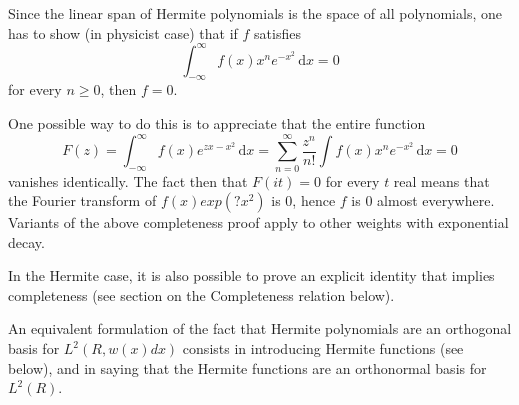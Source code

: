 Since the linear span of Hermite polynomials is the space of all polynomials, 
one has to show (in physicist case) that if $f$ satisfies
\begin{equation}
\int_{-\infty}^\infty f(x) x^n e^{- x^2} \, \mathrm{d}x = 0
\end{equation}
for every $n \geq 0$, then $f =0$.

One possible way to do this is to appreciate that the entire function
\begin{equation}
F(z) = \int_{-\infty}^\infty f(x) e^{z x - x^2} \, \mathrm{d}x = \sum_{n=0}^\infty \frac{z^n}{n!}\int f(x) x^n e^{- x^2} \, \mathrm{d}x = 0
\end{equation}
vanishes identically. The fact then that $F(it)=0$ for every $t$ real 
means that the Fourier transform of $f(x)exp(?x^2)$ is 0, hence $f$ is 
0 almost everywhere. Variants of the above completeness proof apply to 
other weights with exponential decay.

In the Hermite case, it is also possible to prove an explicit identity 
that implies completeness (see section on the Completeness relation below).

An equivalent formulation of the fact that Hermite polynomials are an orthogonal 
basis for $L^{2}(R,w(x)dx)$ consists in introducing Hermite functions (see below), 
and in saying that the Hermite functions are an orthonormal basis for $L^2(R)$.




